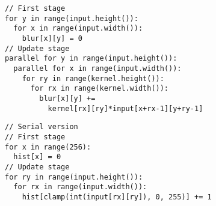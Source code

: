 \begin{lstlisting}[caption={Convolution blur kernel is easily parallelizable across \code{Var} $x$ adn $y$.}, label={lst:blur_loopness}]
// First stage
for y in range(input.height()):
  for x in range(input.width()):
    blur[x][y] = 0
// Update stage
parallel for y in range(input.height()):
  parallel for x in range(input.width()):
    for ry in range(kernel.height()):
      for rx in range(kernel.width()):    
        blur[x][y] += 
          kernel[rx][ry]*input[x+rx-1][y+ry-1] 
\end{lstlisting}

\begin{lstlisting}[caption={Histogram of an image is hard to parallelize since its update stage does not involve \code{RVar}s.}, label={lst:histogram_loopness}]
// Serial version
// First stage
for x in range(256):
  hist[x] = 0
// Update stage
for ry in range(input.height()):
  for rx in range(input.width()):
    hist[clamp(int(input[rx][ry]), 0, 255)] += 1
\end{lstlisting}
